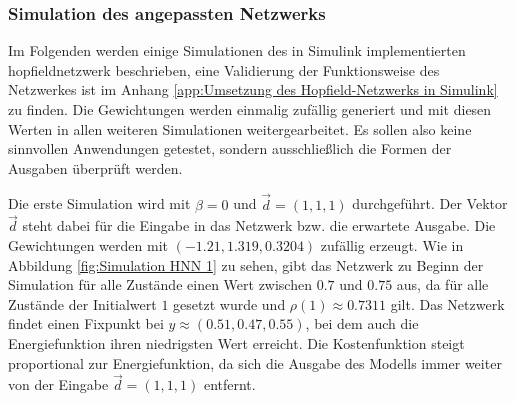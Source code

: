 \subsubsection{Simulation des angepassten Netzwerks}
\label{chap:Simulation des angepassten Netzwerks}

Im Folgenden werden einige Simulationen des in Simulink implementierten \gls{hopfieldnetzwerk} beschrieben, eine Validierung der Funktionsweise des Netzwerkes ist im Anhang \ref{app:Umsetzung des Hopfield-Netzwerks in Simulink} zu finden. Die Gewichtungen werden einmalig zufällig generiert und mit diesen Werten in allen weiteren Simulationen weitergearbeitet. Es sollen also keine sinnvollen Anwendungen getestet, sondern ausschließlich die Formen der Ausgaben überprüft werden.

Die erste Simulation wird mit \(\beta=0\) und \(\vec{d}=(1,1,1)\) durchgeführt. Der Vektor \(\vec{d}\) steht dabei für die Eingabe in das Netzwerk bzw. die erwartete Ausgabe. Die Gewichtungen werden mit \((-1.21,1.319,0.3204)\) zufällig erzeugt. Wie in Abbildung \ref{fig:Simulation HNN 1} zu sehen, gibt das Netzwerk zu Beginn der Simulation für alle Zustände einen Wert zwischen \(0.7\) und \(0.75\) aus, da für alle Zustände der Initialwert \(1\) gesetzt wurde und \(\rho(1)\approx{0.7311}\) gilt. Das Netzwerk findet einen Fixpunkt bei \(y\approx{(0.51,0.47,0.55)}\), bei dem auch die Energiefunktion ihren niedrigsten Wert erreicht. Die Kostenfunktion steigt proportional zur Energiefunktion, da sich die Ausgabe des Modells immer weiter von der Eingabe \(\vec{d}=(1,1,1)\) entfernt.

